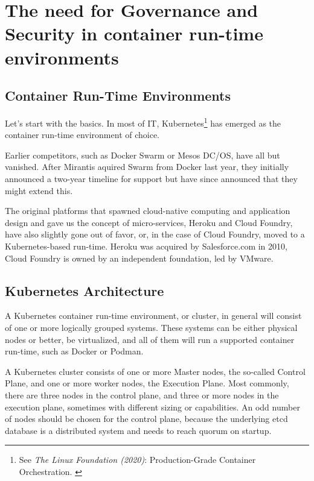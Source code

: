 %
%

\pagebreak
\section{The need for Governance and Security in container run-time environments}

\onehalfspacing

\subsection{Container Run-Time Environments}

Let's start with the basics. In most of IT, Kubernetes\footnote{See \textit{The Linux Foundation (2020)}: Production-Grade Container Orchestration. \cite{kubernetes}} has emerged as the container run-time environment of choice.

Earlier competitors, such as Docker Swarm or Mesos DC/OS, have all but vanished. After Mirantis aquired Swarm from Docker last year, they initially announced a two-year timeline for support but have since announced that they might extend this.

The original platforms that spawned cloud-native computing and application design and gave us the concept of micro-services, Heroku and Cloud Foundry, have also slightly gone out of favor, or, in the case of Cloud Foundry, moved to a Kubernetes-based run-time. Heroku was acquired by Salesforce.com in 2010, Cloud Foundry is owned by an independent foundation, led by VMware.

\subsection{Kubernetes Architecture}

A Kubernetes container run-time environment, or cluster, in general will consist of one or more logically grouped systems. These systems can be either physical nodes or better, be virtualized, and all of them will run a supported container run-time, such as Docker or Podman.

A Kubernetes cluster consists of one or more Master nodes, the so-called Control Plane, and one or more worker nodes, the Execution Plane. Most commonly, there are three nodes in the control plane, and three or more nodes in the execution plane, sometimes with different sizing or capabilities. An odd number of nodes should be chosen for the control plane, because the underlying etcd database is a distributed system and needs to reach quorum on startup.

